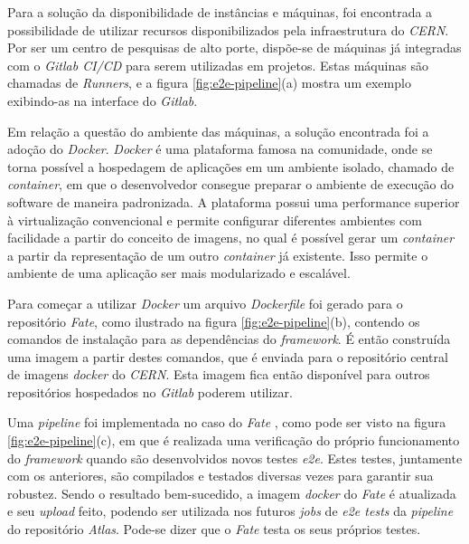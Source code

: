 Para a solução da disponibilidade de instâncias e máquinas, foi encontrada a possibilidade de utilizar recursos disponibilizados pela infraestrutura do \emph{CERN}. Por ser um centro de pesquisas de alto porte, dispõe-se de máquinas já integradas com o \emph{Gitlab CI/CD} para serem utilizadas em projetos. Estas máquinas são chamadas de \emph{Runners}, e a figura \ref{fig:e2e-pipeline}(a) mostra um exemplo exibindo-as na interface do \emph{Gitlab}.

Em relação a questão do ambiente das máquinas, a solução encontrada foi a adoção do \emph{Docker}. \emph{Docker} é uma plataforma famosa na comunidade, onde se torna possível a hospedagem de aplicações em um ambiente isolado, chamado de \emph{container}, em que o desenvolvedor consegue preparar o ambiente de execução do software de maneira padronizada. A plataforma possui uma performance superior à virtualização convencional e permite configurar diferentes ambientes com facilidade a partir do conceito de imagens, no qual é possível gerar um \emph{container} a partir da representação de um outro \emph{container} já existente. Isso permite o ambiente de uma aplicação ser mais modularizado e escalável.

Para começar a utilizar \emph{Docker} um arquivo \emph{Dockerfile} foi gerado para o repositório \emph{Fate}, como ilustrado na figura \ref{fig:e2e-pipeline}(b), contendo os comandos de instalação para as dependências do \emph{framework}. É então construída uma imagem a partir destes comandos, que é enviada para o repositório central de imagens \emph{docker} do \emph{CERN}. Esta imagem fica então disponível para outros repositórios hospedados no \emph{Gitlab} poderem utilizar.

Uma \emph{pipeline} foi implementada no caso do \emph{Fate} , como pode ser visto na figura \ref{fig:e2e-pipeline}(c), em que é realizada uma verificação do próprio funcionamento do \emph{framework} quando são desenvolvidos novos testes \emph{e2e}. Estes testes, juntamente com os anteriores, são compilados e testados diversas vezes para garantir sua robustez. Sendo o resultado bem-sucedido, a imagem \emph{docker} do \emph{Fate} é atualizada e seu \emph{upload} feito, podendo ser utilizada nos futuros \emph{jobs} de \emph{e2e tests} da \emph{pipeline} do repositório \emph{Atlas}. Pode-se dizer que o \emph{Fate} testa os seus próprios testes.

